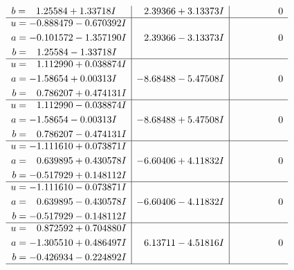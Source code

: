 \documentclass[1p]{elsarticle_modified}
\theoremstyle{definition}
\begin{document}
$$\begin{array}{c|c|c}
\begin{aligned}
b &= \phantom{-}1.25584 + 1.33718 I\end{aligned}
 & \phantom{-}2.39366 + 3.13373 I & \phantom{-0.000000 } 0 \\ \hline\begin{aligned}
u &= -0.888479 - 0.670392 I \\
a &= -0.101572 - 1.357190 I \\
b &= \phantom{-}1.25584 - 1.33718 I\end{aligned}
 & \phantom{-}2.39366 - 3.13373 I & \phantom{-0.000000 } 0 \\ \hline\begin{aligned}
u &= \phantom{-}1.112990 + 0.038874 I \\
a &= -1.58654 + 0.00313 I \\
b &= \phantom{-}0.786207 + 0.474131 I\end{aligned}
 & -8.68488 - 5.47508 I & \phantom{-0.000000 } 0 \\ \hline\begin{aligned}
u &= \phantom{-}1.112990 - 0.038874 I \\
a &= -1.58654 - 0.00313 I \\
b &= \phantom{-}0.786207 - 0.474131 I\end{aligned}
 & -8.68488 + 5.47508 I & \phantom{-0.000000 } 0 \\ \hline\begin{aligned}
u &= -1.111610 + 0.073871 I \\
a &= \phantom{-}0.639895 + 0.430578 I \\
b &= -0.517929 + 0.148112 I\end{aligned}
 & -6.60406 + 4.11832 I & \phantom{-0.000000 } 0 \\ \hline\begin{aligned}
u &= -1.111610 - 0.073871 I \\
a &= \phantom{-}0.639895 - 0.430578 I \\
b &= -0.517929 - 0.148112 I\end{aligned}
 & -6.60406 - 4.11832 I & \phantom{-0.000000 } 0 \\ \hline\begin{aligned}
u &= \phantom{-}0.872592 + 0.704880 I \\
a &= -1.305510 + 0.486497 I \\
b &= -0.426934 - 0.224892 I\end{aligned}
 & \phantom{-}6.13711 - 4.51816 I & \phantom{-0.000000 } 0\\
 \hline 
 \end{array}$$\newpage$$\begin{array}{c|c|c}  

\end{array}$$
\end{document}
